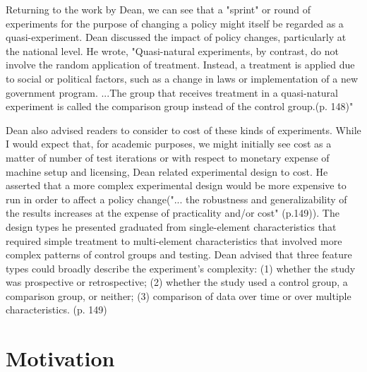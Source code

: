 
Returning to the work by Dean, we can see that a "sprint" or round of experiments for the purpose of changing a policy might itself be regarded as a quasi-experiment. Dean discussed the impact of policy changes, particularly at the national level. He wrote, "Quasi-natural experiments, by contrast, do not involve the random application of treatment. Instead, a treatment is applied due to social or political factors, such as a change in laws or implementation of a new government program. ...The group that receives treatment in a quasi-natural experiment is called the comparison group instead of the control group.(p. 148)"

Dean also advised readers to consider to cost of these kinds of experiments. While I would expect that, for academic purposes, we might initially see cost as a matter of number of test iterations or with respect to monetary expense of machine setup and licensing, Dean related experimental design to cost. He asserted that a more complex experimental design would be more expensive to run in order to affect a policy change("... the robustness and generalizability of the results increases at the expense of practicality and/or cost" (p.149)). The design types he presented graduated from single-element characteristics that required simple treatment to multi-element characteristics that involved more complex patterns of control groups and testing. Dean advised that three feature types could broadly describe the experiment's complexity:
(1) whether the study was prospective or retrospective; (2) whether the study used a control group, a comparison group, or neither; (3) comparison of data over time or over multiple characteristics. (p. 149)




\section{Motivation}

